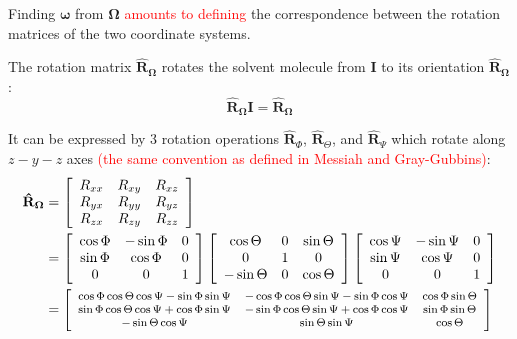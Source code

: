 %
Finding $\boldsymbol{\omega}$ from $\mathbf{\Omega}$ \textcolor{red}{amounts
to defining} the correspondence between the rotation matrices of the
two coordinate systems. 

The rotation matrix $\mathbf{\hat{R}}_{\mathbf{\Omega}}$ rotates
the solvent molecule from $\mathbf{I}$ to its orientation $\mathbf{\hat{R}}_{\mathbf{\Omega}}$:
\begin{equation}
\mathbf{\hat{R}}_{\mathbf{\Omega}}\mathbf{I}=\mathbf{\hat{R}}_{\mathbf{\Omega}}
\end{equation}


It can be expressed by 3 rotation operations $\mathbf{\hat{R}}_{\Phi}$,
$\mathbf{\hat{R}}_{\Theta}$, and $\mathbf{\hat{R}}_{\Psi}$ which
rotate along $z-y-z$ axes \textcolor{red}{(the same convention as
defined in Messiah and Gray-Gubbins)}:
\begin{align}
\mathbf{\hat{R}}_{\mathbf{\Omega}} & =\left[\begin{array}{ccc}
R_{xx} & R_{xy} & R_{xz}\\
R_{yx} & R_{yy} & R_{yz}\\
R_{zx} & R_{zy} & R_{zz}
\end{array}\right]\\
 & =\left[\begin{array}{ccc}
\cos\Phi & -\sin\Phi & 0\\
\sin\Phi & \cos\Phi & 0\\
0 & 0 & 1
\end{array}\right]\left[\begin{array}{ccc}
\cos\Theta & 0 & \sin\Theta\\
0 & 1 & 0\\
-\sin\Theta & 0 & \cos\Theta
\end{array}\right]\left[\begin{array}{ccc}
\cos\Psi & -\sin\Psi & 0\\
\sin\Psi & \cos\Psi & 0\\
0 & 0 & 1
\end{array}\right]\nonumber \\
 & =\footnotesize\left[\begin{array}{ccc}
\cos\Phi\cos\Theta\cos\Psi-\sin\Phi\sin\Psi & -\cos\Phi\cos\Theta\sin\Psi-\sin\Phi\cos\Psi & \cos\Phi\sin\Theta\\
\sin\Phi\cos\Theta\cos\Psi+\cos\Phi\sin\Psi & -\sin\Phi\cos\Theta\sin\Psi+\cos\Phi\cos\Psi & \sin\Phi\sin\Theta\\
-\sin\Theta\cos\Psi & \sin\Theta\sin\Psi & \cos\Theta
\end{array}\right]\nonumber 
\end{align}
